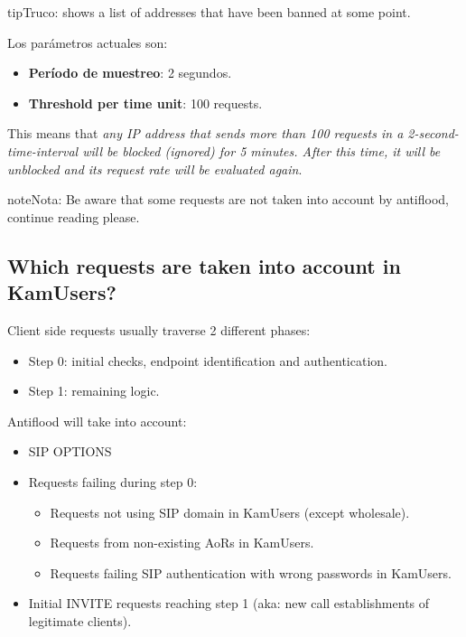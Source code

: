 \documentclass[letterpaper,10pt,spanish]{sphinxmanual}
\begin{document}
\begin{notice}{tip}{Truco:}
{\hyperref[administration_portal/platform/antiflood_banned_ips:antiflood\string-banned\string-ips]{}} shows a list of addresses that have been banned at some point.
\end{notice}

Los parámetros actuales son:
\begin{itemize}
\item {} 
\textbf{Período de muestreo}: 2 segundos.

\item {} 
\textbf{Threshold per time unit}: 100 requests.

\end{itemize}

This means that \emph{any IP address that sends more than 100 requests in a 2-second-time-interval will be blocked (ignored)
for 5 minutes. After this time, it will be unblocked and its request rate will be evaluated again}.

\begin{notice}{note}{Nota:}
Be aware that some requests are not taken into account by antiflood, continue reading please.
\end{notice}


\subsection{Which requests are taken into account in KamUsers?}
\label{security_and_maintenance/security/antiflooding:which-requests-are-taken-into-account-in-kamusers}
Client side requests usually traverse 2 different phases:
\begin{itemize}
\item {} 
Step 0: initial checks, endpoint identification and authentication.

\item {} 
Step 1: remaining logic.

\end{itemize}

Antiflood will take into account:
\begin{itemize}
\item {} 
SIP OPTIONS

\item {} 
Requests failing during step 0:
\begin{itemize}
\item {} 
Requests not using SIP domain in KamUsers (except wholesale).

\item {} 
Requests from non-existing AoRs in KamUsers.

\item {} 
Requests failing SIP authentication with wrong passwords in KamUsers.

\end{itemize}

\item {} 
Initial INVITE requests reaching step 1 (aka: new call establishments of legitimate clients).

\end{itemize}
\end{document}
